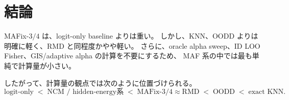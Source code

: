 \documentclass[a4paper,11pt]{ltjsarticle}
\begin{document}
\section{結論}

MAFix-$3/4$ は、logit-only baseline よりは重い。
しかし、KNN、OODD よりは明確に軽く、RMD と同程度かやや軽い。
さらに、oracle alpha sweep、ID LOO Fisher、GIS/adaptive alpha の計算を不要にするため、
MAF 系の中では最も単純で計算量が小さい。

したがって、計算量の観点では次のように位置づけられる。
\begin{equation}
    \text{logit-only}
    \;<\;
    \text{NCM / hidden-energy系}
    \;<\;
    \text{MAFix-}3/4 \approx \text{RMD}
    \;<\;
    \text{OODD}
    \;<\;
    \text{exact KNN}.
\end{equation}
\end{document}

